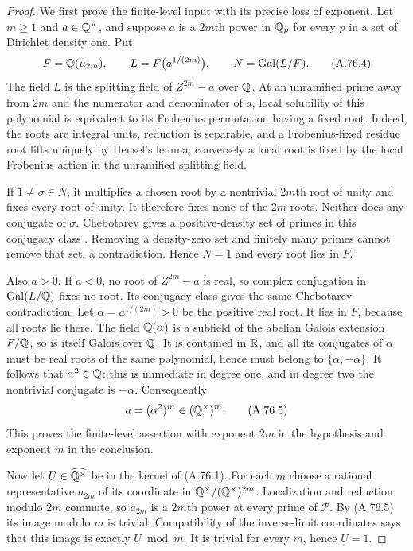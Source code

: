 \begin{proof}
We first prove the finite-level input with its precise loss
of exponent.  Let $m\ge1$ and $a\in\mathbb Q^\times$, and suppose
$a$ is a $2m$th power in $\mathbb Q_p$ for every $p$ in a set of
Dirichlet density one.  Put
\[
      F=\mathbb Q(\mu_{2m}),\qquad
      L=F\bigl(a^{1/(2m)}\bigr),\qquad
      N=\operatorname{Gal}(L/F).
       \tag{A.76.4}
\]
The field $L$ is the splitting field of $Z^{2m}-a$ over
$\mathbb Q$.  At an unramified prime away from $2m$ and the numerator
and denominator of $a$, local solubility of this polynomial
is equivalent to its Frobenius permutation having a fixed
root.  Indeed, the roots are integral units, reduction is
separable, and a Frobenius-fixed residue root lifts uniquely
by Hensel's lemma; conversely a local root is fixed by the
local Frobenius action in the unramified splitting field.

If $1\ne\sigma\in N$, it multiplies a chosen root by a
nontrivial $2m$th root of unity and fixes every root of unity.
It therefore fixes none of the $2m$ roots.  Neither does any
conjugate of $\sigma$.  Chebotarev gives a positive-density
set of primes in this conjugacy class
\cite[Theorem 8.31]{AgentMilneANT}.  Removing a density-zero
set and finitely many primes cannot remove that set, a
contradiction.  Hence $N=1$ and every root lies in $F$.

Also $a>0$.  If $a<0$, no root of $Z^{2m}-a$ is real,
so complex conjugation in $\operatorname{Gal}(L/\mathbb Q)$ fixes
no root.  Its conjugacy class gives the same Chebotarev
contradiction.  Let $\alpha=a^{1/(2m)}>0$ be the positive
real root.  It lies in $F$, because all roots lie there.
The field $\mathbb Q(\alpha)$ is a subfield of the abelian Galois
extension $F/\mathbb Q$, so is itself Galois over $\mathbb Q$.
It is contained in $\mathbb R$, and all its conjugates of $\alpha$
must be real roots of the same polynomial, hence must belong
to $\{\alpha,-\alpha\}$.  It follows that $\alpha^2\in\mathbb Q$:
this is immediate in degree one, and in degree two the
nontrivial conjugate is $-\alpha$.
Consequently
\[
                        a=(\alpha^2)^m\in(\mathbb Q^\times)^m.
       \tag{A.76.5}
\]
This proves the finite-level assertion with exponent $2m$
in the hypothesis and exponent $m$ in the conclusion.

Now let $U\in\widehat{\mathbb Q^\times}$ be in the kernel of
(A.76.1).  For each $m$ choose a rational representative
$a_{2m}$ of its coordinate in
$\mathbb Q^\times/(\mathbb Q^\times)^{2m}$.  Localization and reduction
modulo $2m$ commute, so $a_{2m}$ is a $2m$th power at
every prime of $\mathcal P$.  By (A.76.5) its image modulo
$m$ is trivial.  Compatibility of the inverse-limit
coordinates says that this image is exactly $U\bmod m$.
It is trivial for every $m$, hence $U=1$.


\end{proof}
